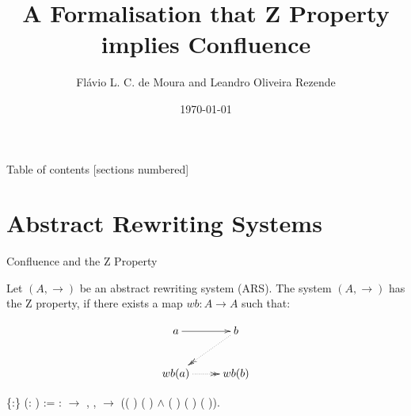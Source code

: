\documentclass[10pt]{beamer}
\title{A Formalisation that Z Property implies Confluence}
\date{\today}
\author{Flávio L. C. de Moura and Leandro Oliveira Rezende}
\institute{Universidade de Brasília}
\begin{document}
\maketitle
\begin{frame}{Table of contents}
  [sections numbered]
  \tableofcontents[hideallsubsections]
\end{frame}

\section{Abstract Rewriting Systems}

\begin{frame}[fragile]{Confluence and the Z Property}
  
  \begin{definition}[Z Property]
    Let $(A,\to)$ be an abstract rewriting system (ARS). The system $(A,\to)$ has the Z property, if there exists a map $wb:A \to A$ such that:
    
    \[
      \xymatrix{
        a \ar[r] &  b \ar@{.>>}[dl]\\
        wb(a) \ar@{.>>}[r] & wb(b) \\ 
      }
    \]
\end{definition}

  \begin{coqdoccode}
    \coqdocemptyline \coqdocnoindent {}
     \{:\}
    (:  ) :=
    \coqdoctac{\ensuremath{\exists}} :
    \ensuremath{\rightarrow} ,
    \coqdockw{\ensuremath{\forall}}  ,
       \ensuremath{\rightarrow}
    (( ) 
    ( ) \ensuremath{\land}
    ( ) (
    ) ( )).\coqdoceol
  \end{coqdoccode}
\end{frame}
\end{document}
